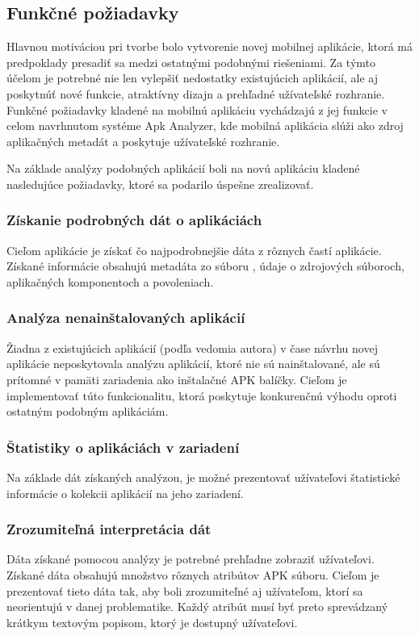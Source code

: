 \subsection{Funkčné požiadavky}
Hlavnou motiváciou pri tvorbe bolo vytvorenie novej mobilnej aplikácie, ktorá má predpoklady presadiť sa medzi ostatnými podobnými riešeniami.  Za týmto účelom je potrebné nie len vylepšiť nedostatky existujúcich aplikácií, ale aj poskytnúť nové funkcie, atraktívny dizajn a prehľadné užívateľské rozhranie.
Funkčné požiadavky kladené na mobilnú aplikáciu vychádzajú z jej funkcie v celom navrhnutom systéme Apk Analyzer, kde mobilná aplikácia slúži ako zdroj aplikačných metadát a poskytuje užívateľské rozhranie.


Na základe analýzy podobných aplikácií boli na novú aplikáciu kladené nasledujúce požiadavky, ktoré sa podarilo úspešne zrealizovať.

\subsubsection{\textbf{Získanie podrobných dát o aplikáciách}}
Cieľom aplikácie je získať čo najpodrobnejšie dáta z rôznych častí aplikácie. Získané informácie obsahujú metadáta zo súboru , údaje o zdrojových súboroch, aplikačných komponentoch a povoleniach. 

\subsubsection{\textbf{Analýza nenainštalovaných aplikácií}}
Žiadna z existujúcich aplikácií (podľa vedomia autora) v čase návrhu novej aplikácie neposkytovala analýzu aplikácií, ktoré nie sú nainštalované, ale sú prítomné v pamäti zariadenia ako inštalačné APK balíčky. Cieľom je implementovať túto funkcionalitu, ktorá poskytuje konkurenčnú výhodu oproti ostatným podobným aplikáciám.

\subsubsection{\textbf{Štatistiky o aplikáciách v zariadení}}
Na základe dát získaných analýzou, je možné prezentovať užívateľovi štatistické informácie o kolekcii aplikácií na jeho zariadení.

\subsubsection{\textbf{Zrozumiteľná interpretácia dát}}
Dáta získané pomocou analýzy je potrebné prehľadne zobraziť užívateľovi.  Získané dáta obsahujú množstvo rôznych atribútov APK súboru. Cieľom je prezentovať tieto dáta tak, aby boli zrozumiteľné aj užívateľom, ktorí sa neorientujú v danej problematike. Každý atribút musí byť preto sprevádzaný krátkym textovým popisom, ktorý je dostupný užívateľovi.

